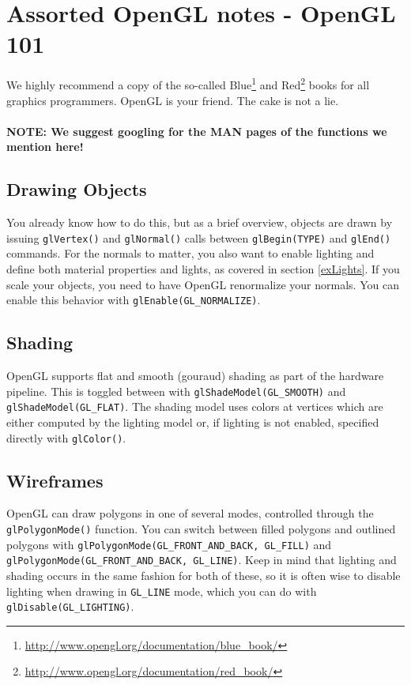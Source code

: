 \documentclass[]{article}
\begin{document}
\pagebreak

\section{Assorted OpenGL notes - OpenGL 101}

We highly recommend a copy of the so-called Blue\footnote{\url{http://www.opengl.org/documentation/blue_book/}} and Red\footnote{\url{http://www.opengl.org/documentation/red_book/}} books for all graphics programmers. OpenGL is your friend. The cake is not a lie. 
\\
\\\textbf{NOTE: We suggest googling for the MAN pages of the functions we mention here!}

\subsection{Drawing Objects}

You already know how to do this, but as a brief overview, objects are drawn by issuing \verb=glVertex()= and \verb=glNormal()= calls between \verb=glBegin(TYPE)= and \verb=glEnd()= commands. For the normals to matter, you also want to enable lighting and define both material properties and lights, as covered in section \ref{exLights}. If you scale your objects, you need to have OpenGL renormalize your normals. You can enable this behavior with \verb=glEnable(GL_NORMALIZE)=.  

\subsection{Shading}

OpenGL supports flat and smooth (gouraud) shading as part of the hardware pipeline. This is toggled between with \verb=glShadeModel(GL_SMOOTH)= and \verb=glShadeModel(GL_FLAT)=. The shading model uses colors at vertices which are either computed by the lighting model or, if lighting is not enabled, specified directly with \verb=glColor()=.

\subsection{Wireframes}

OpenGL can draw polygons in one of several modes, controlled through the \verb=glPolygonMode()= function. You can switch between filled polygons and outlined polygons with \verb=glPolygonMode(GL_FRONT_AND_BACK, GL_FILL)= and \verb=glPolygonMode(GL_FRONT_AND_BACK, GL_LINE)=. Keep in mind that lighting and shading occurs in the same fashion for both of these, so it is often wise to disable lighting when drawing in \verb=GL_LINE= mode, which you can do with \verb=glDisable(GL_LIGHTING)=.
\end{document}
